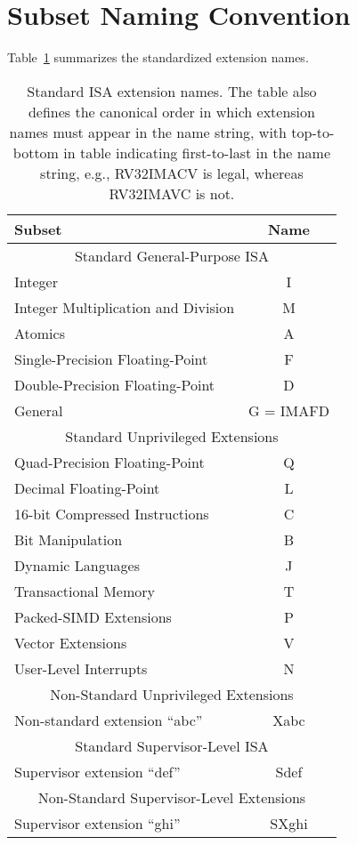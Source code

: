 \section{Subset Naming Convention}
Table~\ref{isanametable} summarizes the standardized extension names.
~\\
\begin{table}[h]
\center
\begin{tabular}{|l|c|}
\hline
Subset & Name \\
\hline
\hline
\multicolumn{2}{|c|}{Standard General-Purpose ISA}\\
\hline
Integer & I \\
Integer Multiplication and Division & M \\
Atomics & A \\
Single-Precision Floating-Point & F \\
Double-Precision Floating-Point & D \\
\hline
General & G = IMAFD \\
\hline
\multicolumn{2}{|c|}{Standard Unprivileged Extensions}\\
\hline
Quad-Precision Floating-Point & Q \\
Decimal Floating-Point & L \\
16-bit Compressed Instructions & C \\
Bit Manipulation & B \\
Dynamic Languages & J \\
Transactional Memory & T \\
Packed-SIMD Extensions & P \\
Vector Extensions & V \\
User-Level Interrupts & N \\
\hline
\hline
\multicolumn{2}{|c|}{Non-Standard Unprivileged Extensions}\\
\hline
Non-standard extension ``abc'' & Xabc \\
\hline
\hline
\multicolumn{2}{|c|}{Standard Supervisor-Level ISA}\\
\hline
Supervisor extension ``def'' & Sdef \\
\hline
\hline
\multicolumn{2}{|c|}{Non-Standard Supervisor-Level Extensions}\\
\hline
Supervisor extension ``ghi'' & SXghi \\
\hline
\end{tabular}
\caption{Standard ISA extension names.  The table also defines the
  canonical order in which extension names must appear in the name
  string, with top-to-bottom in table indicating first-to-last in the
  name string, e.g., RV32IMACV is legal, whereas RV32IMAVC is not.}
\label{isanametable}
\end{table}


